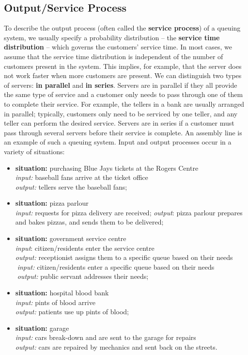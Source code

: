 \subsection{Output/Service Process}
To describe the output process (often called the \textbf{service process}) of a queuing system, we usually specify a probability distribution -- the \textbf{service time distribution} -- which governs the customers' service time. \newpage\noindent In most cases, we assume that the service time distribution is independent of the number of customers present in the system. This implies, for example, that the server does not work faster when more customers are present. \newl We can distinguish two types of servers: \textbf{in parallel} and \textbf{in series}. Servers are in parallel if they all provide the same type of service and a customer only needs to pass through one of them to complete their service. For example, the tellers in a bank are usually arranged in parallel; typically, customers only need to be serviced by one teller, and any teller can perform the desired service. Servers are in series if a customer must pass through several servers before their service is complete. An assembly line is an example of such a queuing system.
\newl 
Input and output processes occur in a variety of situations:
\begin{itemize}[noitemsep]
\item \textbf{situation:} purchasing Blue Jays tickets at the Rogers Centre\\ \textit{input:} baseball fans arrive at the ticket office\\ \textit{output:} tellers serve the baseball fans;
\item \textbf{situation:} pizza parlour \\ \textit{input:} requests for pizza delivery are received; \textit{output}: pizza parlour prepares and bakes pizzas, and sends them to be delivered; 
\item \textbf{situation:} government service centre\\ \textit{input}: citizen/residents enter the service centre \\ \textit{output:} receptionist assigns them to a specific queue based on their needs\\
\textcolor{white}{.}\qquad \textit{input:} citizen/residents enter a specific queue based on their needs \\ \textcolor{white}{.}\qquad \textit{output:} public servant addresses their needs;
\item \textbf{situation:} hospital blood bank\\ \textit{input:} pints of blood arrive\\ \textit{output:} patients use up pints of blood;
\item \textbf{situation:} garage\\ \textit{input:} cars break-down and are sent to the garage for repairs\\ \textit{output:} cars are repaired by mechanics and sent back on the streets.
\end{itemize}
